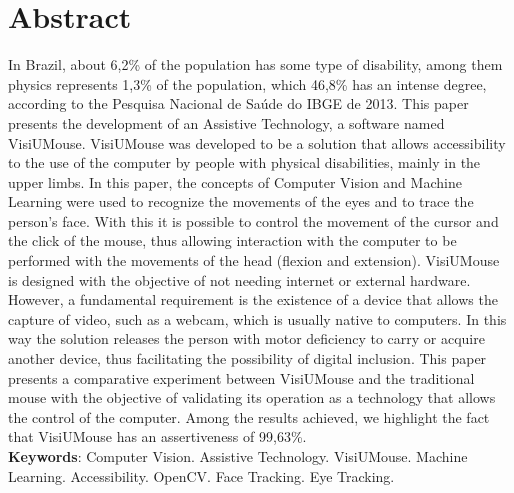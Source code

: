 \chapter*{Abstract}
{\fontsize{12pt}{\baselineskip} \selectfont \noindent {}
In Brazil, about 6,2\% of the population has some type of disability, among them physics represents 1,3\% of the population, which 46,8\% has an intense degree, according to the {Pesquisa  Nacional de Saúde do IBGE de 2013}. This paper presents the development of an Assistive Technology, a software named VisiUMouse. VisiUMouse was developed to be a solution that allows accessibility to the use of the computer by people with physical disabilities, mainly in the upper limbs. In this paper, the concepts of Computer Vision and Machine Learning were used to recognize the movements of the eyes and to trace the person's face. With this it is possible to control the movement of the cursor and the click of the mouse, thus allowing interaction with the computer to be performed with the movements of the head (flexion and extension). VisiUMouse is designed with the objective of not needing internet or external hardware. However, a fundamental requirement is the existence of a device that allows the capture of video, such as a webcam, which is usually native to computers. In this way the solution releases the person with motor deficiency to carry or acquire another device, thus facilitating the possibility of digital inclusion. This paper presents a comparative experiment between VisiUMouse and the traditional mouse with the objective of validating its operation as a technology that allows the control of the computer. Among the results achieved, we highlight the fact that VisiUMouse has an assertiveness of 99,63\%.
}
\\

\noindent \onehalfspacing {}
\textbf{Keywords}: Computer Vision. Assistive Technology. VisiUMouse. Machine Learning. Accessibility. OpenCV. Face Tracking. Eye Tracking.
